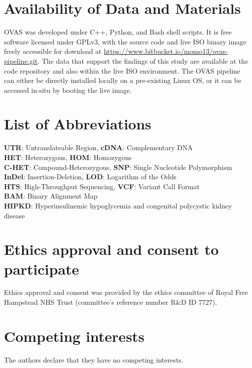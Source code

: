 \documentclass[twocolumn]{bmcart}%
\def\app{OVAS}
\begin{document}
\begin{backmatter}

\section*{Availability of Data and Materials}
\app{} was developed under C++, Python, and Bash shell scripts. It is free software licensed under GPLv3, with the source code and live ISO binary image freely accessible for download at \url{https://www.bitbucket.io/momo13/ovas-pipeline.git}. The data that support the findings of this study are available at the code repository and also within the live ISO environment. The \app{} pipeline can either be directly installed locally on a pre-existing Linux OS, or it can be accessed in-situ by booting the live image.


\section*{List of Abbreviations}
\textbf{UTR}:  Untranslateable Region, \textbf{cDNA}: Complementary DNA\\
\textbf{HET}: Heterozygous, \textbf{HOM}: Homozygous\\
\textbf{C-HET}: Compound-Heterozygous, \textbf{SNP}: Single Nucleotide Polymorphism\\
\textbf{InDel}: Insertion-Deletion, \textbf{LOD}: Logarithm of the Odds\\
\textbf{HTS}: High-Throughput Sequencing, \textbf{VCF}: Variant Call Format\\
\textbf{BAM}: Binary Alignment Map\\
\textbf{HIPKD}: Hyperinsulinemic hypoglycemia and congenital polycystic kidney disease\\


\section*{Ethics approval and consent to participate}
Ethics approval and consent was provided by the ethics committee of Royal Free Hampstead NHS Trust (committee's reference number R\&D ID 7727).

\section*{Competing interests}
The authors declare that they have no competing interests.


\end{backmatter}
\end{document}
